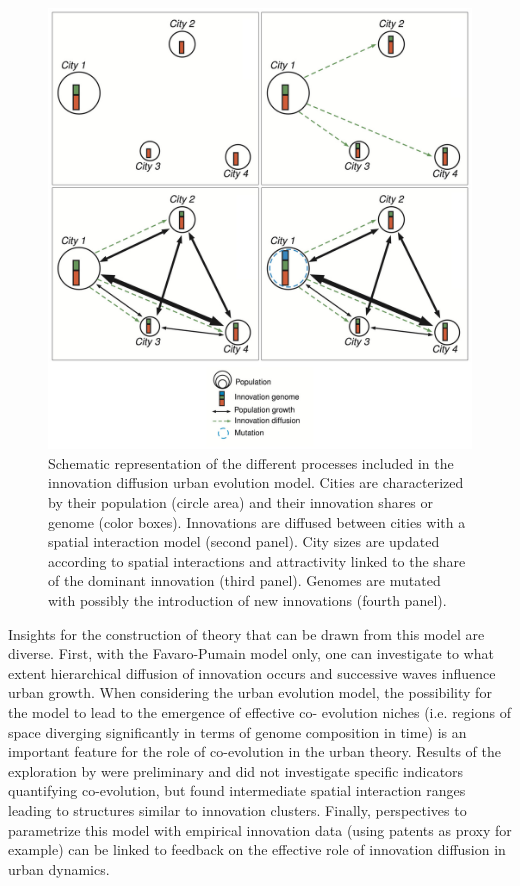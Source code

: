 \documentclass[10pt]{article}
\begin{document}
\begin{figure}
	\includegraphics[width=\linewidth]{Fig2.jpg}	
	\caption{Schematic representation of the different processes included in the innovation diffusion urban evolution model. Cities are characterized by their population (circle area) and their innovation shares or genome (color boxes). Innovations are diffused between cities with a spatial interaction model (second panel). City sizes are updated according to spatial interactions and attractivity linked to the share of the dominant innovation (third panel). Genomes are mutated with possibly the introduction of new innovations (fourth panel).\label{fig:fig2}}
\end{figure}


Insights for the construction of theory that can be drawn from this model are diverse. First, with the Favaro-Pumain model only, one can investigate to what extent hierarchical diffusion of innovation occurs and successive waves influence urban growth. When considering the urban evolution model, the possibility for the model to lead to the emergence of effective co- evolution niches (i.e. regions of space diverging significantly in terms of genome composition in time) is an important feature for the role of co-evolution in the urban theory. Results of the exploration by \citep{raimbault2020model} were preliminary and did not investigate specific indicators quantifying co-evolution, but found intermediate spatial interaction ranges leading to structures similar to innovation clusters. Finally, perspectives to parametrize this model with empirical innovation data (using patents as proxy for example) can be linked to feedback on the effective role of innovation diffusion in urban dynamics.
\end{document}
